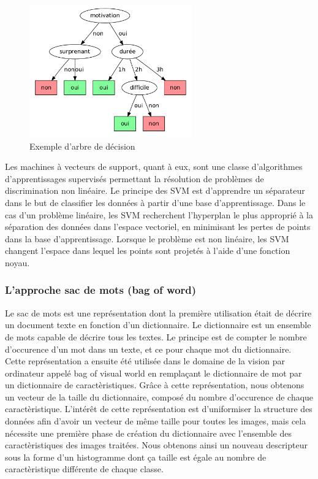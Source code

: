 \begin{figure}[!ht]
  \begin{center}
    \includegraphics[width=7cm]{image/randomForest.png}
    \caption[The LOF caption]{Exemple d'arbre de décision\footnotemark }
  \end{center}
\end{figure}

Les machines à vecteurs de support\cite{SVM}, quant à eux, sont une classe d'algorithmes d'apprentissages supervisés permettant la
résolution de 
problèmes de discrimination non linéaire. Le principe des SVM est d'apprendre un séparateur dans le but de classifier les données à partir
d'une base d'apprentissage. Dans le cas d'un problème linéaire, les SVM recherchent l'hyperplan le plus approprié à la séparation des données
dans l'espace vectoriel, en minimisant les pertes de points dans la base d'apprentissage. Lorsque le problème est non linéaire,
les SVM changent l'espace dans lequel les points sont projetés à l'aide d'une fonction noyau.

\subsubsection{L'approche sac de mots (bag of word)}
Le sac de mots est une représentation dont la première utilisation était de décrire un document texte en fonction d'un dictionnaire.
Le dictionnaire est un ensemble de mots capable de décrire tous les textes.
Le principe est de compter le nombre d'occurence d'un mot dans un texte, et ce pour chaque mot du dictionnaire. Cette représentation
a ensuite été utilisée dans le domaine de la vision par ordinateur appelé \og bag of visual world \fg\cite{BagOfWord} 
en remplaçant le dictionnaire de mot par un dictionnaire
de caractèristiques. Grâce à cette représentation, nous obtenons un vecteur de la taille du dictionnaire, composé du nombre 
d'occurence de chaque caractèristique. L'intérêt de cette représentation est d'uniformiser la structure des données
afin d'avoir un vecteur de même taille pour toutes les images, mais cela nécessite une première phase de création du dictionnaire
avec l'ensemble des caractèristiques des images traitées. Nous obtenons ainsi un nouveau descripteur sous la forme d'un
histogramme dont ça taille est égale au nombre de caractèristique différente de chaque classe.

